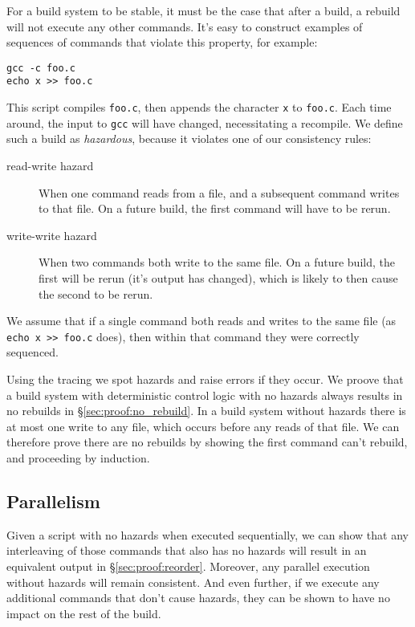 For a \Make build system to be stable, it must be the case that after a build, a rebuild will not execute any other commands. It's easy to construct examples of sequences of commands that violate this property, for example:

\begin{verbatim}
gcc -c foo.c
echo x >> foo.c
\end{verbatim}

This script compiles \texttt{foo.c}, then appends the character \texttt{x} to \texttt{foo.c}. Each time around, the input to \texttt{gcc} will have changed, necessitating a recompile. We define such a build as \emph{hazardous}, because it violates one of our consistency rules:

\begin{description}
\item[read-write hazard] When one command reads from a file, and a subsequent command writes to that file. On a future build, the first command will have to be rerun.
\item[write-write hazard] When two commands both write to the same file. On a future build, the first will be rerun (it's output has changed), which is likely to then cause the second to be rerun.
\end{description}

We assume that if a single command both reads and writes to the same file (as \texttt{echo x >> foo.c} does), then within that command they were correctly sequenced.

Using the tracing we spot hazards and raise errors if they occur. We proove that a build system with deterministic control logic with no hazards always results in no rebuilds in \S\ref{sec:proof:no_rebuild}. In a build system without hazards there is at most one write to any file, which occurs before any reads of that file. We can therefore prove there are no rebuilds by showing the first command can't rebuild, and proceeding by induction.

\subsection{Parallelism}

Given a script with no hazards when executed sequentially, we can show that any interleaving of those commands that also has no hazards will result in an equivalent output in \S\ref{sec:proof:reorder}. Moreover, any parallel execution without hazards will remain consistent. And even further, if we execute any additional commands that don't cause hazards, they can be shown to have no impact on the rest of the build.

